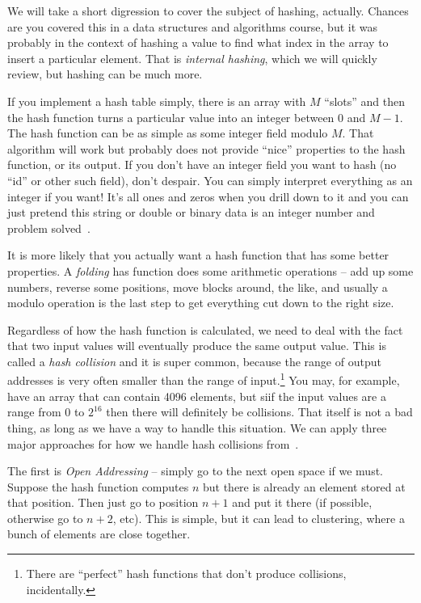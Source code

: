 We will take a short digression to cover the subject of hashing, actually. Chances are you covered this in a data structures and algorithms course, but it was probably in the context of hashing a value to find what index in the array to insert a particular element. That is \textit{internal hashing}, which we will quickly review, but hashing can be much more.

If you implement a hash table simply, there is an array with $M$ ``slots'' and then the hash function turns a particular value into an integer between $0$ and $M-1$. The hash function can be as simple as some integer field modulo $M$. That algorithm will work but probably does not provide ``nice'' properties to the hash function, or its output. If you don't have an integer field you want to hash (no ``id'' or other such field), don't despair. You can simply interpret everything as an integer if you want! It's all ones and zeros when you drill down to it and you can just pretend this string or double or binary data is an integer number and problem solved~\cite{fds}.

It is more likely that you actually want a hash function that has some better properties. A \textit{folding} has function does some arithmetic operations -- add up some numbers, reverse some positions, move blocks around, the like, and usually a modulo operation is the last step to get everything cut down to the right size.

Regardless of how the hash function is calculated, we need to deal with the fact that two input values will eventually produce the same output value. This is called a \textit{hash collision} and it is super common, because the range of output addresses is very often smaller than the range of input.\footnote{There are ``perfect'' hash functions that don't produce collisions, incidentally.} You may, for example, have an array that can contain 4096 elements, but  siif the input values are a range from $0$ to $2^{16}$ then there will definitely be collisions. That itself is not a bad thing, as long as we have a way to handle this situation. We can apply three major approaches for how we handle hash collisions from~\cite{fds}. 

The first is \textit{Open Addressing} -- simply go to the next open space if we must. Suppose the hash function computes $n$ but there is already an element stored at that position. Then just go to position $n+1$ and put it there (if possible, otherwise go to $n+2$, etc). This is simple, but it can lead to clustering, where a bunch of elements are close together.

